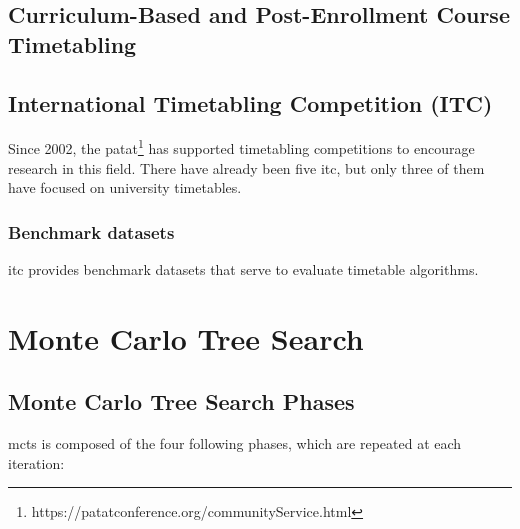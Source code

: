 \subsection{Curriculum-Based and Post-Enrollment Course Timetabling}

\subsection{International Timetabling Competition (ITC)}

Since 2002, the \ac{patat}\footnote{https://patatconference.org/communityService.html} has supported timetabling competitions to encourage research in this field. There have already been five \ac{itc}, but only three of them have focused on university timetables.

\subsubsection{Benchmark datasets}

\ac{itc} provides benchmark datasets that serve to evaluate timetable algorithms. %

\section{Monte Carlo Tree Search}

\subsection{Monte Carlo Tree Search Phases}
\ac{mcts} is composed of the four following phases, which are repeated at each iteration:

